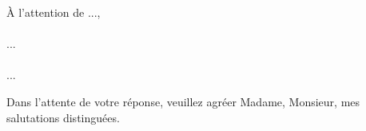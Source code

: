 \documentclass[CoverLetter, fr]{lettertemplate}
\begin{document}
    \makeheader

    \noindent
    À l’attention de ...,

    \paragraph{}
        ...

    \paragraph{}
        ...

    \vskip 0.25cm

    \noindent
    Dans l’attente de votre réponse, veuillez agréer Madame, Monsieur, mes salutations distinguées.

    \sign
\end{document}
